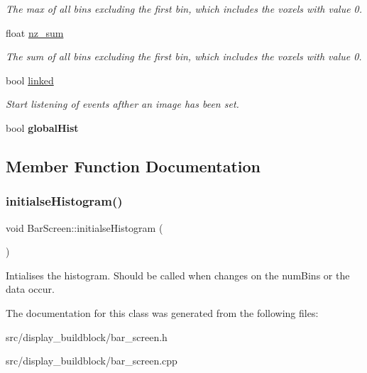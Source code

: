 \begin{DoxyCompactItemize}
\begin{DoxyCompactList}\small\item\em The max of all bins excluding the first bin, which includes the voxels with value 0. \end{DoxyCompactList}\item 
\mbox{\label{classBarScreen_adf2fa1b3686c92bd20e8c0befc06caf7}} 
float \mbox{\hyperlink{classBarScreen_adf2fa1b3686c92bd20e8c0befc06caf7}{nz\+\_\+sum}}
\begin{DoxyCompactList}\small\item\em The sum of all bins excluding the first bin, which includes the voxels with value 0. \end{DoxyCompactList}\item 
\mbox{\label{classBarScreen_a2222951d5a5ce44bb22da49e62e8f797}} 
bool \mbox{\hyperlink{classBarScreen_a2222951d5a5ce44bb22da49e62e8f797}{linked}}
\begin{DoxyCompactList}\small\item\em Start listening of events afther an image has been set. \end{DoxyCompactList}\item 
\mbox{\label{classBarScreen_a3c0cbb54bb95017b259687ee79232a08}} 
bool {\bfseries global\+Hist}
\end{DoxyCompactItemize}


\subsection{Member Function Documentation}
\mbox{\label{classBarScreen_ae652343345f7cc3f7726569c1195ee9a}} 
\subsubsection{\texorpdfstring{initialse\+Histogram()}{initialseHistogram()}}
{\footnotesize\ttfamily void Bar\+Screen\+::initialse\+Histogram (\begin{DoxyParamCaption}{ }\end{DoxyParamCaption})\hspace{0.3cm}{\ttfamily [protected]}}

Intialises the histogram. Should be called when changes on the num\+Bins or the data occur. 

The documentation for this class was generated from the following files\+:\begin{DoxyCompactItemize}
\item 
src/display\+\_\+buildblock/bar\+\_\+screen.\+h\item 
src/display\+\_\+buildblock/bar\+\_\+screen.\+cpp\end{DoxyCompactItemize}
